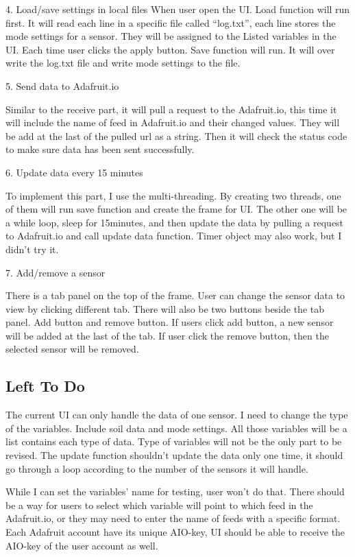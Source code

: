 \documentclass[onecolumn, draftclsnofoot,10pt, compsoc]{IEEEtran}
\begin{document}
	4.	Load/save settings in local files
    When user open the UI. Load function will run first. It will read each line in a specific file called “log.txt”, each line stores the mode settings for a sensor. They will be assigned to the Listed variables in the UI. Each time user clicks the apply button. Save function will run. It will over write the log.txt file and write mode settings to the file.
    
    5.	Send data to Adafruit.io
    
    Similar to the receive part, it will pull a request to the Adafruit.io, this time it will include the name of feed in Adafruit.io and their changed values. They will be add at the last of the pulled url as a string. Then it will check the status code to make sure data has been sent successfully.
    
    6.	Update data every 15 minutes
    
    To implement this part, I use the multi-threading. By creating two threads, one of them will run save function and create the frame for UI. The other one will be a while loop, sleep for 15minutes, and then update the data by pulling a request to Adafruit.io and call update data function. Timer object may also work, but I didn’t try it.
    
    7.	Add/remove a sensor
    
    There is a tab panel on the top of the frame. User can change the sensor data to view by clicking different tab. There will also be two buttons beside the tab panel. Add button and remove button. If users click add button, a new sensor will be added at the last of the tab. If user click the remove button, then the selected sensor will be removed. 
    \subsection{Left To Do}%
    The current UI can only handle the data of one sensor. I need to change the type of the variables. Include soil data and mode settings. All those variables will be a list contains each type of data. Type of variables will not be the only part to be revised. The update function shouldn’t update the data only one time, it should go through a loop according to the number of the sensors it will handle. 
    
    While I can set the variables’ name for testing, user won’t do that. There should be a way for users to select which variable will point to which feed in the Adafruit.io, or they may need to enter the name of feeds with a specific format. Each Adafruit account have its unique AIO-key, UI should be able to receive the AIO-key of the user account as well.
    
\end{document}
